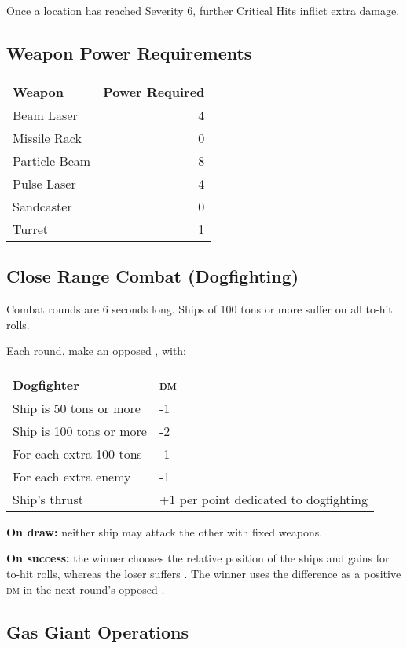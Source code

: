 \documentclass{cheatsheet}
\begin{document}
\begin{multicols}{3}
Once a location has reached Severity 6, further Critical Hits inflict
 extra damage.

\subsection{Weapon Power Requirements}

\begin{tabularx}{\linewidth}{Xr} \toprule
  Weapon & Power Required \\ \midrule
  Beam Laser & 4 \\
  Missile Rack & 0 \\
  Particle Beam & 8 \\
  Pulse Laser & 4 \\
  Sandcaster & 0 \\
  Turret & 1 \\ \bottomrule
\end{tabularx}

\subsection{Close Range Combat (Dogfighting)}

Combat rounds are 6 seconds long.  Ships of 100 tons or more suffer
 on all to-hit rolls.

Each round, make an opposed , with:

\begin{tabularx}{\linewidth}{lX} \toprule
  Dogfighter & \textsc{dm} \\ \midrule
  Ship is 50 tons or more & -1 \\
  Ship is 100 tons or more & -2 \\
  For each extra 100 tons & -1 \\
  For each extra enemy & -1 \\
  Ship's thrust & +1 per point dedicated to dogfighting \\ \bottomrule
\end{tabularx}

\textbf{On draw:} neither ship may attack the other with fixed weapons.

\textbf{On success:} the winner chooses the relative position of the
ships and gains  for to-hit rolls, whereas the loser
suffers .  The winner uses the difference as a positive
\textsc{dm} in the next round's opposed .

\subsection{Gas Giant Operations}


\end{multicols}
\end{document}
